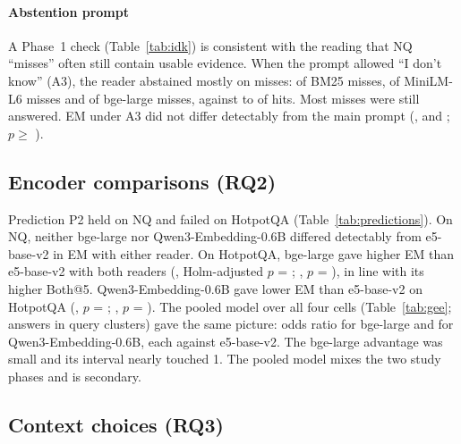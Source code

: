 \paragraph{Abstention prompt}
A Phase~1 check (Table~\ref{tab:idk}) is consistent with the reading that NQ ``misses'' often still contain usable evidence. When the prompt allowed ``I don't know'' (A3), the reader abstained mostly on misses:  of BM25 misses,  of MiniLM-L6 misses and  of bge-large misses, against  to  of hits. Most misses were still answered. EM under A3 did not differ detectably from the main prompt (,  and ; $p\ge$ ).

\subsection{Encoder comparisons (RQ2)}\label{sec:res-encoders}
Prediction P2 held on NQ and failed on HotpotQA (Table~\ref{tab:predictions}). On NQ, neither bge-large nor Qwen3-Embedding-0.6B differed detectably from e5-base-v2 in EM with either reader. On HotpotQA, bge-large gave higher EM than e5-base-v2 with both readers (, Holm-adjusted $p$ = ; , $p$ = ), in line with its higher Both@5. Qwen3-Embedding-0.6B gave lower EM than e5-base-v2 on HotpotQA (, $p$ = ; , $p$ = ). The pooled model over all four cells (Table~\ref{tab:gee};  answers in  query clusters) gave the same picture: odds ratio   for bge-large and   for Qwen3-Embedding-0.6B, each against e5-base-v2. The bge-large advantage was small and its interval nearly touched 1. The pooled model mixes the two study phases and is secondary.



\subsection{Context choices (RQ3)}\label{sec:res-context}
